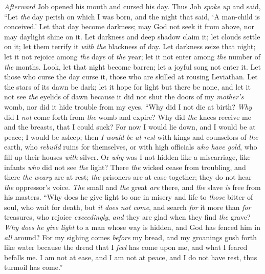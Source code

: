 \begin{biblechapter} %
 \textit{Afterward} Job opened his mouth and cursed his day.
\verse Thus Job \textit{spoke up} and said,
\verse “Let \textit{the} day perish on which I was born, 
and the night that said, ‘A man-child is conceived.’
\verse Let that day become darkness; 
may God not seek it from above, 
nor may daylight shine on it.
\verse Let darkness and deep shadow claim it; 
let clouds settle on it; 
let them terrify it \textit{with the} blackness of day.
\verse Let darkness seize that night; 
let it not rejoice among \textit{the} days of \textit{the} year; 
let it not enter among \textit{the} number of \textit{the} months.
\verse Look, let that night become barren; 
let a joyful song not enter it.
\verse Let those who curse the day curse it, 
those who are skilled at rousing Leviathan.
\verse Let the stars of its dawn be dark; 
let it hope for light but there be none, 
and let it not see \textit{the} eyelids of dawn
\verse because it did not shut the doors of my \textit{mother’s} womb, 
nor did it hide trouble from my eyes.
 “Why did I not die at birth? 
\textit{Why} did I \textit{not} come forth from \textit{the} womb and expire?
\verse Why did \textit{the} knees receive me 
and the breasts, that I could suck?
\verse For now I would lie down, and I would be at peace; 
I would be asleep; then \textit{I would be at rest}
\verse with kings and counselors of \textit{the} earth, 
who \textit{rebuild}  ruins for themselves,
\verse or with high officials \textit{who have gold}, 
who fill up their houses \textit{with} silver.
\verse Or \textit{why} was I not hidden like a miscarriage, 
like infants \textit{who} did not see \textit{the} light?
\verse There \textit{the} wicked cease from troubling, 
and there \textit{the} \textit{weary} are at rest;
\verse \textit{the} prisoners are at ease together; 
they do not hear \textit{the} oppressor’s voice.
\verse \textit{The} small and \textit{the} great \textit{are} there, 
and \textit{the} slave \textit{is} free from his masters.
 “Why does he give light to one in misery 
and life to \textit{those} bitter of soul,
\verse who wait for death, but \textit{it does not come}, 
and search \textit{for} it more than \textit{for} treasures,
\verse who rejoice \textit{exceedingly}, 
\textit{and} they are glad when they find \textit{the} grave?
\verse \textit{Why does he give light} to a man whose way is hidden, 
and God has fenced him in \textit{all} around?
\verse For my sighing comes \textit{before} my bread, 
and my groanings gush forth like water
\verse because the dread that I \textit{feel} has come upon me, 
and what I feared befalls me.
\verse I am not at ease, and I am not at peace, 
and I do not have rest, thus turmoil has come.”
\end{biblechapter}

